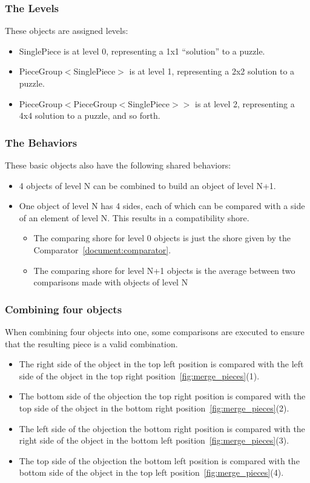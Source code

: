 \documentclass{article}
\begin{document}
\subsubsection{The Levels}

These objects are assigned levels:
\begin{itemize}
\item SinglePiece is at level 0, representing a 1x1 ``solution'' to a puzzle.
\item PieceGroup\(<\)SinglePiece\(>\) is at level 1, representing a 2x2 solution to a puzzle.
\item PieceGroup\(<\)PieceGroup\(<\)SinglePiece\(>>\) is at level 2, representing a 4x4 solution to a puzzle, and so forth.
\end{itemize}

\subsubsection{The Behaviors}

These basic objects also have the following shared behaviors:
\begin{itemize}
  \item 4 objects of level N can be combined to build an object of level N+1.
  \item One object of level N has 4 sides, each of which can be compared with a side of an element of level N. This results in a compatibility shore.
  \begin{itemize}
    \item The comparing shore for level 0 objects is just the shore given by the Comparator~\cref{document:comparator}.
    \item The comparing shore for level N+1 objects is the average between two comparisons made with objects of level N
  \end{itemize}
\end{itemize}

\subsubsection{Combining four objects}\label{document:combining_four_objects}

When combining four objects into one, some comparisons are executed to ensure that the resulting piece is a valid  combination.
\begin{itemize}
  \item The right side of the object in the top left position is compared with the left side of the object in the top right position~\cref{fig:merge_pieces}(1).
  \item The bottom side of the objection the top right position is compared with the top side of the object in the bottom right position~\cref{fig:merge_pieces}(2).
  \item The left side of the objection the bottom right position is compared with the right side of the object in the bottom left position~\cref{fig:merge_pieces}(3).
  \item The top side of the objection the bottom left position is compared with the bottom side of the object in the top left position~\cref{fig:merge_pieces}(4).
\end{itemize}
\end{document}
